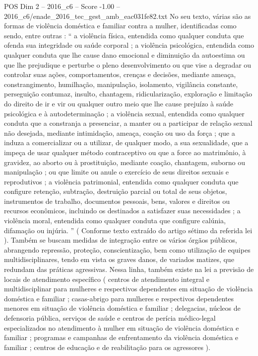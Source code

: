 \begin{textsample}{POS Dim 2 – 2016\_c6 – Score -1.00 – 2016\_c6/enade\_2016\_tec\_gest\_amb\_eac031fe82.txt}
No seu texto, várias são as formas de violência doméstica e familiar contra a mulher, identificadas como sendo, entre outras : “ a violência física, entendida como qualquer conduta que ofenda sua integridade ou saúde corporal ; a violência psicológica, entendida como qualquer conduta que lhe cause dano emocional e diminuição da autoestima ou que lhe prejudique e perturbe o pleno desenvolvimento ou que vise a degradar ou controlar suas ações, comportamentos, crenças e decisões, mediante ameaça, constrangimento, humilhação, manipulação, isolamento, vigilância constante, perseguição contumaz, insulto, chantagem, ridicularização, exploração e limitação do direito de ir e vir ou qualquer outro meio que lhe cause prejuízo à saúde psicológica e à autodeterminação ; a violência sexual, entendida como qualquer conduta que a constranja a presenciar, a manter ou a participar de relação sexual não desejada, mediante intimidação, ameaça, coação ou uso da força ; que a induza a comercializar ou a utilizar, de qualquer modo, a sua sexualidade, que a impeça de usar qualquer método contraceptivo ou que a force ao matrimônio, à gravidez, ao aborto ou à prostituição, mediante coação, chantagem, suborno ou manipulação ; ou que limite ou anule o exercício de seus direitos sexuais e reprodutivos ; a violência patrimonial, entendida como qualquer conduta que configure retenção, subtração, destruição parcial ou total de seus objetos, instrumentos de trabalho, documentos pessoais, bens, valores e direitos ou recursos econômicos, incluindo os destinados a satisfazer suas necessidades ; a violência moral, entendida como qualquer conduta que configure calúnia, difamação ou injúria. ” ( Conforme texto extraído do artigo sétimo da referida lei ).
Também se buscam medidas de integração entre os vários órgãos públicos, abrangendo repressão, proteção, conscientização, bem como utilização de equipes multidisciplinares, tendo em vista os graves danos, de variados matizes, que redundam das práticas agressivas.
Nessa linha, também existe na lei a previsão de locais de atendimento específico ( centros de atendimento integral e multidisciplinar para mulheres e respectivos dependentes em situação de violência doméstica e familiar ; casas-abrigo para mulheres e respectivos dependentes menores em situação de violência doméstica e familiar ; delegacias, núcleos de defensoria pública, serviços de saúde e centros de perícia médico-legal especializados no atendimento à mulher em situação de violência doméstica e familiar ; programas e campanhas de enfrentamento da violência doméstica e familiar ; centros de educação e de reabilitação para os agressores ).

\end{textsample}
